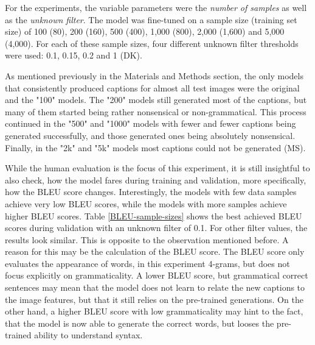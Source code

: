 \documentclass[11pt]{article}
\begin{document}
For the experiments, the variable parameters were the \emph{number of samples} as well as the \emph{unknown filter}. The model was fine-tuned on a sample size (training set size) of 100 (80), 200 (160), 500 (400), 1,000 (800), 2,000 (1,600) and 5,000 (4,000). For each of these sample sizes, four different unknown filter thresholds were used: 0.1, 0.15, 0.2 and 1 (DK).

As mentioned previously in the Materials and Methods section, the only models that consistently produced captions for almost all test images were the original and the "100" models. The "200" models still generated most of the captions, but many of them started being rather nonsensical or non-grammatical. This process continued in the "500" and "1000" models with fewer and fewer captions being generated successfully, and those generated ones being absolutely nonsensical. Finally, in the "2k" and "5k" models most captions could not be generated (MS).

While the human evaluation is the focus of this experiment, it is still insightful to also check, how the model fares during training and validation, more specifically, how the BLEU score changes. Interestingly, the models with few data samples achieve very low BLEU scores, while the models with more samples achieve higher BLEU scores. Table \ref{BLEU-sample-sizes} shows the best achieved BLEU scores during validation with an unknown filter of 0.1. For other filter values, the results look similar. This is opposite to the observation mentioned before. A reason for this may be the calculation of the BLEU score. The BLEU score only evaluates the appearance of words, in this experiment 4-grams, but does not focus explicitly on grammaticality. A lower BLEU score, but grammatical correct sentences may mean that the model does not learn to relate the new captions to the image features, but that it still relies on the pre-trained generations. On the other hand, a higher BLEU score with low grammaticality may hint to the fact, that the model is now able to generate the correct words, but looses the pre-trained ability to understand syntax.
\end{document}

